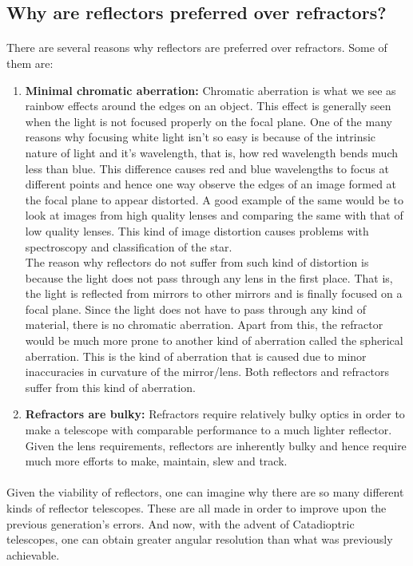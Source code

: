 \documentclass[a4paper,twoside]{article}
\numberwithin{equation}{section}
\begin{document}
\subsection{Why are reflectors preferred over refractors?}
\paragraph{}
There are several reasons why reflectors are preferred over refractors. Some of them are: 
\begin{enumerate}
\item {\textbf{Minimal chromatic aberration:} Chromatic aberration is what we see as rainbow effects around the edges on an object. This effect is generally seen when the light is not focused properly on the focal plane. One of the many reasons why focusing white light isn't so easy is because of the intrinsic nature of light and it's wavelength, that is, how red wavelength bends much less than blue. This difference causes red and blue wavelengths to focus at different points and hence one way observe the edges of an image formed at the focal plane to appear distorted. A good example of the same would be to look at images from high quality lenses and comparing the same with that of low quality lenses. This kind of image distortion causes problems with spectroscopy and classification of the star. 
\\ The reason why reflectors do not suffer from such kind of distortion is because the light does not pass through any lens in the first place. That is, the light is reflected from mirrors to other mirrors and is finally focused on a focal plane. Since the light does not have to pass through any kind of material, there is no chromatic aberration. Apart from this, the refractor would be much more prone to another kind of aberration called the spherical aberration. This is the kind of aberration that is caused due to minor inaccuracies in curvature of the mirror/lens. Both reflectors and refractors suffer from this kind of aberration. 
}
\item {\textbf{Refractors are bulky:} Refractors require relatively bulky optics in order to make a telescope with comparable performance to a much lighter reflector. Given the lens requirements, reflectors are inherently bulky and hence require much more efforts to make, maintain, slew and track.
}
\end{enumerate}
\paragraph{}
Given the viability of reflectors, one can imagine why there are so many different kinds of reflector telescopes. These are all made in order to improve upon the previous generation's errors. And now, with the advent of Catadioptric telescopes, one can obtain greater angular resolution than what was previously achievable. 
\end{document}
